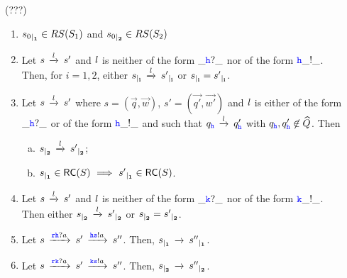 \begin{lemma} (???) \hfill
\label{lem:indrestrict}  
\begin{enumerate}[1)]
\item
\label{lem:indrestrict-a}
$\restrict{s_0}{1}\in RS(S_1)$ and  $\restrict{s_0}{2}\in RS(S_2)$
\item
\label{lem:indrestrict-b}
Let $s\lts{\elle}s'$ 
and $\elle$ is neither of the form $\_\HH?\_$ nor of the form $\HH\_!\_$.\\
Then, for $i=1,2$,  either $\restrict{s}{i}\lts{\elle}\restrict{s'}{i}$ or  $\restrict{s}{i}=\restrict{s'}{i}$.
\item
\label{lem:indrestrict-c}
Let $s\lts{\elle}s'$ where $s= (\vec{q},\vec{w})$, $s'= (\vec{q'},\vec{w'})$
and  $\elle$ is either of the form $\_\HH?\_$ or of the form $\HH\_!\_$ and such that
$q_\hh\lts{\elle}q'_\hh$ with $q_\hh,q'_\hh\not\in\widehat{Q}$. Then
\begin{enumerate}[a)]
\item
\label{lem:indrestrict-c1}
$\restrict{s}{2}\lts{\elle}\restrict{s'}{2}$;
\item
\label{lem:indrestrict-c2}
$\restrict{s}{1}\in \RS(S) \implies \restrict{s'}{1}\in \RS(S)$.
\end{enumerate}
\item
Let $s\lts{\elle}s'$ 
and $\elle$ is neither of the form $\_\KK?\_$ nor of the form $\KK\_!\_$.\\
Then either $\restrict{s}{2}\lts{\elle}\restrict{s'}{2}$ or  $\restrict{s}{2}=\restrict{s'}{2}$.
\item
Let $s\lts{\ttr\HH?a} s'\lts{\HH\tts!a} s''$.
Then, $\restrict{s}{1}\lts{}\restrict{s''}{1}$.
\item
Let $s\lts{\ttr\KK?a} s'\lts{\KK\tts!a} s''$.
Then, $\restrict{s}{2}\lts{}\restrict{s''}{2}$.
\end{enumerate}
\end{lemma}

